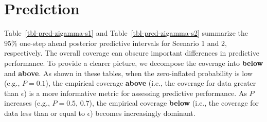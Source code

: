 \documentclass[
  letterpaper,
  double,
  12pt,
  1.0in]{beavtex}
\begin{document}
\begin{table}

\caption{\label{tbl-coverage-2-zigamma}Coverage Rates for All Parameters Across 10 Replicates for Scenario 2 (varying $P$ and $\epsilon$), with true parameter values fixed at $\mu = 7$ and $\beta = 1$. The table includes all combinations of $P = 0.1, 0.5, 0.7$ and $\epsilon = 0.1, 0.4$. Specifically, the top two rows correspond to $P = 0.1$ with $\epsilon = 0.1$ and $0.4$; the middle two rows to $P = 0.5$ with $\epsilon = 0.1$ and $0.4$; and the final two rows to $P = 0.7$ with $\epsilon = 0.1$ and $0.4$.}


\end{table}%

\chapter{Prediction}\label{sec-ch2-pred}

Table~\ref{tbl-pred-zigamma-s1} and Table~\ref{tbl-pred-zigamma-s2}
summarize the \(95\%\) one-step ahead posterior predictive intervals for
Scenario 1 and 2, respectively. The overall coverage can obscure
important differences in predictive performance. To provide a clearer
picture, we decompose the coverage into \textbf{below} and
\textbf{above}. As shown in these tables, when the zero-inflated
probability is low (e.g., \(P = 0.1\)), the empirical coverage
\textbf{above} (i.e., the coverage for data greater than \(\epsilon\))
is a more informative metric for assessing predictive performance. As
\(P\) increases (e.g., \(P = 0.5\), \(0.7\)), the empirical coverage
\textbf{below} (i.e., the coverage for data less than or equal to
\(\epsilon\)) becomes increasingly dominant.
\end{document}

